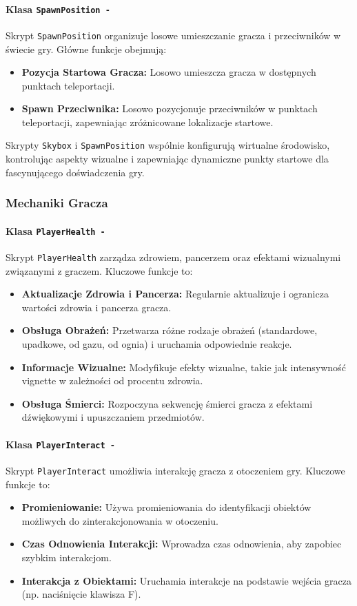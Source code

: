 \paragraph{Klasa \texttt{SpawnPosition -}}
Skrypt \texttt{SpawnPosition} organizuje losowe umieszczanie gracza i przeciwników w świecie gry. Główne funkcje obejmują:
\begin{itemize}
  \item \textbf{Pozycja Startowa Gracza:} Losowo umieszcza gracza w dostępnych punktach teleportacji.
  \item \textbf{Spawn Przeciwnika:} Losowo pozycjonuje przeciwników w punktach teleportacji, zapewniając zróżnicowane lokalizacje startowe.
\end{itemize}
Skrypty \texttt{Skybox} i \texttt{SpawnPosition} wspólnie konfigurują wirtualne środowisko, kontrolując aspekty wizualne i zapewniając dynamiczne punkty startowe dla fascynującego doświadczenia gry.

\subsubsection{Mechaniki Gracza}

\paragraph{Klasa \texttt{PlayerHealth -}}
Skrypt \texttt{PlayerHealth} zarządza zdrowiem, pancerzem oraz efektami wizualnymi związanymi z graczem. Kluczowe funkcje to:
\begin{itemize}
  \item \textbf{Aktualizacje Zdrowia i Pancerza:} Regularnie aktualizuje i ogranicza wartości zdrowia i pancerza gracza.
  \item \textbf{Obsługa Obrażeń:} Przetwarza różne rodzaje obrażeń (standardowe, upadkowe, od gazu, od ognia) i uruchamia odpowiednie reakcje.
  \item \textbf{Informacje Wizualne:} Modyfikuje efekty wizualne, takie jak intensywność vignette w zależności od procentu zdrowia.
  \item \textbf{Obsługa Śmierci:} Rozpoczyna sekwencję śmierci gracza z efektami dźwiękowymi i upuszczaniem przedmiotów.
\end{itemize}

\paragraph{Klasa \texttt{PlayerInteract -}}
Skrypt \texttt{PlayerInteract} umożliwia interakcję gracza z otoczeniem gry. Kluczowe funkcje to:
\begin{itemize}
  \item \textbf{Promieniowanie:} Używa promieniowania do identyfikacji obiektów możliwych do zinterakcjonowania w otoczeniu.
  \item \textbf{Czas Odnowienia Interakcji:} Wprowadza czas odnowienia, aby zapobiec szybkim interakcjom.
  \item \textbf{Interakcja z Obiektami:} Uruchamia interakcje na podstawie wejścia gracza (np. naciśnięcie klawisza F).
\end{itemize}

